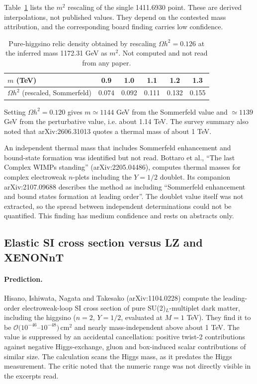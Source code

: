 \documentclass[11pt,a4paper]{article}
\begin{document}
Table~\ref{tab:rescale} lists the $m^2$ rescaling of the single 1411.6930 point. These are derived interpolations, not published values. They depend on the contested mass attribution, and the corresponding board finding carries low confidence.

\begin{table}[h]
\centering
\begin{tabular}{lccccc}
\toprule
$m$ (TeV) & 0.9 & 1.0 & 1.1 & 1.2 & 1.3\\
\midrule
$\Omega h^2$ (rescaled, Sommerfeld) & 0.074 & 0.092 & 0.111 & 0.132 & 0.155\\
\bottomrule
\end{tabular}
\caption{Pure-higgsino relic density obtained by rescaling $\Omega h^2=0.126$ at the inferred mass 1172.31 GeV as $m^2$. Not computed and not read from any paper.}
\label{tab:rescale}
\end{table}

Setting $\Omega h^2 = 0.120$ gives $m \simeq 1144$ GeV from the Sommerfeld value and $\simeq 1139$ GeV from the perturbative value, i.e. about 1.14 TeV. The survey summary also noted that arXiv:2606.31013 quotes a thermal mass of about 1 TeV.

An independent thermal mass that includes Sommerfeld enhancement and bound-state formation was identified but not read. Bottaro et al., ``The last Complex WIMPs standing'' (arXiv:2205.04486), computes thermal masses for complex electroweak $n$-plets including the $Y=1/2$ doublet. Its companion arXiv:2107.09688 describes the method as including ``Sommerfeld enhancement and bound states formation at leading order''. The doublet value itself was not extracted, so the spread between independent determinations could not be quantified. This finding has medium confidence and rests on abstracts only.

\subsection{Elastic SI cross section versus LZ and XENONnT}

\paragraph{Prediction.} Hisano, Ishiwata, Nagata and Takesako (arXiv:1104.0228) compute the leading-order electroweak-loop SI cross section of pure SU(2)$_L$-multiplet dark matter, including the higgsino ($n=2$, $Y=1/2$, evaluated at $M = 1$ TeV). They find it to be $\mathcal{O}(10^{-46}$--$10^{-48})\,\mathrm{cm^2}$ and nearly mass-independent above about 1 TeV. The value is suppressed by an accidental cancellation: positive twist-2 contributions against negative Higgs-exchange, gluon and box-induced scalar contributions of similar size. The calculation scans the Higgs mass, as it predates the Higgs measurement. The critic noted that the numeric range was not directly visible in the excerpts read.
\end{document}
